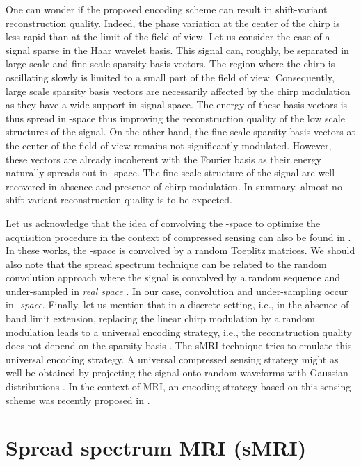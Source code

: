 \documentclass[10pt,draftcls, onecolumn]{IEEEtran}
\begin{document}
One can wonder if the proposed encoding scheme can result in shift-variant reconstruction quality. Indeed, the phase variation at the center of the chirp is less rapid than at the limit of the field of view. Let us consider the case of a signal sparse in the Haar wavelet basis. This signal can, roughly, be separated in large scale and fine scale sparsity basis vectors. The region where the chirp is oscillating slowly is limited to a small part of the field of view. Consequently, large scale sparsity basis vectors are necessarily affected by the chirp modulation as they have a wide support in signal space. The energy of these basis vectors is thus spread in -space thus improving the reconstruction quality of the low scale structures of the signal. On the other hand, the fine scale sparsity basis vectors at the center of the field of view remains not significantly modulated. However, these vectors are already incoherent with the Fourier basis as their energy naturally spreads out in -space. The fine scale structure of the signal are well recovered in absence and presence of chirp modulation. In summary, almost no shift-variant reconstruction quality is to be expected. 

Let us acknowledge that the idea of convolving the -space to optimize the acquisition procedure in the context of compressed sensing can also be found in \cite{sebert08, liang09b, wang09}. In these works, the -space is convolved by a random Toeplitz matrices. We should also note that the spread spectrum technique can be related to the random convolution approach where the signal is convolved by a random sequence and under-sampled in \emph{real space} \cite{romberg09}. In our case, convolution and under-sampling occur in \emph{-space}. Finally, let us mention that in a discrete setting, i.e., in the absence of band limit extension, replacing the linear chirp modulation by a random modulation leads to a universal encoding strategy, i.e., the reconstruction quality does not depend on the sparsity basis \cite{puy11a}. The sMRI technique tries to emulate this universal encoding strategy. A universal compressed sensing strategy might as well be obtained by projecting the signal  onto random waveforms with Gaussian distributions \cite{candes06c, donoho06}. In the context of MRI, an encoding strategy based on this sensing scheme was recently proposed in \cite{haldar10}.

\section{Spread spectrum MRI (sMRI)}
\label{sec:MR measurements}
\end{document}

